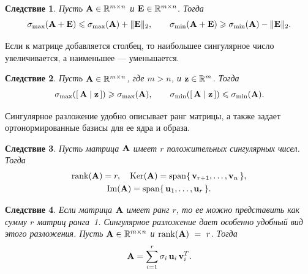 \documentclass[12pt]{article}
\newtheorem{corollary}{Следствие}
\begin{document}
	\begin{corollary}
		Пусть $\textbf{\textup{A}} \in \mathbb{R}^{m \times n}$ и $\textbf{\textup{E}} \in \mathbb{R}^{m \times n}$. Тогда
		\begin{equation}
			\sigma_{\max}(\textbf{\textup{A}} + \textbf{\textup{E}}) 
			\leqslant 
			\sigma_{\max}(\textbf{\textup{A}}) + \|\textbf{\textup{E}}\|_{2},
			\qquad
			\sigma_{\min}(\textbf{\textup{A}} + \textbf{\textup{E}}) 
			\geqslant 
			\sigma_{\min}(\textbf{\textup{A}}) - \|\textbf{\textup{E}}\|_{2}.
		\end{equation}
	\end{corollary}
	Если к матрице добавляется столбец, то наибольшее сингулярное число увеличивается, 
	а наименьшее --- уменьшается.  
	\begin{corollary}
		Пусть $\textbf{\textup{A}} \in \mathbb{R}^{m \times n}$, где $m > n$, и 
		$\textbf{\textup{z}} \in \mathbb{R}^{m}$. Тогда
		\begin{equation}
			\sigma_{\max}\!\left( [\, \textbf{\textup{A}} \mid \textbf{\textup{z}} \,] \right) 
			\geqslant 
			\sigma_{\max}(\textbf{\textup{A}}),
			\qquad
			\sigma_{\min}\!\left( [\, \textbf{\textup{A}} \mid \textbf{\textup{z}} \,] \right) 
			\leqslant 
			\sigma_{\min}(\textbf{\textup{A}}).
		\end{equation}
	\end{corollary}
	
	Сингулярное разложение удобно описывает ранг матрицы, а также задает 
	ортонормированные базисы для ее ядра и образа.
	\begin{corollary}
		Пусть матрица $\textbf{\textup{A}}$ имеет $r$ положительных сингулярных чисел. Тогда
		\begin{equation}
			\begin{gathered}
				\operatorname{rank}(\textbf{\textup{A}}) = r,
				\quad
				\operatorname{Ker}(\textbf{\textup{A}}) = 
				\operatorname{span}\{\, \textbf{\textup{v}}_{r+1}, \ldots, \textbf{\textup{v}}_{n} \,\},\\
				\operatorname{Im}(\textbf{\textup{A}}) = 
				\operatorname{span}\{\, \textbf{\textup{u}}_{1}, \ldots, \textbf{\textup{u}}_{r} \,\}.
			\end{gathered}
		\end{equation}
	\end{corollary}
	
	\begin{corollary}
		Если матрица $\textbf{\textup{A}}$ имеет ранг $r$, то ее можно представить как сумму $r$ матриц ранга~1. 
		Сингулярное разложение дает особенно удобный вид этого разложения.
		Пусть $\textbf{\textup{A}} \in \mathbb{R}^{m \times n}$ и $\operatorname{rank}(\textbf{\textup{A}})~=~r$. Тогда
		\begin{equation}
			\textbf{\textup{A}} = 
			\sum_{i = 1}^{r} 
			\sigma_i\, \textbf{\textup{u}}_i\, \textbf{\textup{v}}_i^{T}.
		\end{equation}
	\end{corollary}
	
\end{document}
